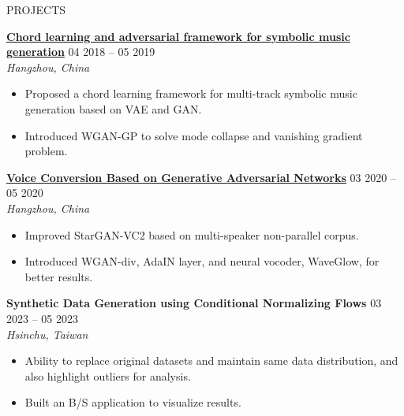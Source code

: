 \documentclass{resume} %
\begin{document}
\begin{rSection}{PROJECTS}
\vspace{-1.25em}
\item \textbf{\href{https://docs.google.com/presentation/d/1ge2It3UsAvTwpAk-9LUnmiz7dRqJnpFX/edit?usp=sharing&ouid=101248488395326982475&rtpof=true&sd=true}{\textbf{\large{\underline{Chord learning and adversarial framework for symbolic music generation}}}}} \hfill {04 2018 – 05 2019}\\\mbox{} \hfill \textit{Hangzhou, China}
\begin{itemize}
    \item Proposed a chord learning framework for multi-track symbolic music generation based on VAE and GAN.
    \item Introduced WGAN-GP to solve mode collapse and vanishing gradient problem.
\end{itemize}
\item \textbf{\href{https://drive.google.com/file/d/1QqgPoRGhaSeS0QWrjnR8mxhvV_onwZ5y/view?usp=drive_link}{\textbf{\large{\underline{Voice Conversion Based on Generative Adversarial Networks}}}}} \hfill {03 2020 -- 05 2020}\\\mbox{} \hfill \textit{Hangzhou, China}
\begin{itemize}
    \item Improved StarGAN-VC2 based on multi-speaker non-parallel corpus.
    \item Introduced WGAN-div, AdaIN layer, and neural vocoder, WaveGlow, for better results.
\end{itemize}
\item \textbf{Synthetic Data Generation using Conditional Normalizing Flows} \hfill {03 2023 -- 05 2023}\\\mbox{} \hfill \textit{Hsinchu, Taiwan}
\begin{itemize}
    \item Ability to replace original datasets and maintain same data distribution, and also highlight outliers for analysis.
    \item Built an B/S application to visualize results.
\end{itemize}
\end{rSection} 
\end{document}
